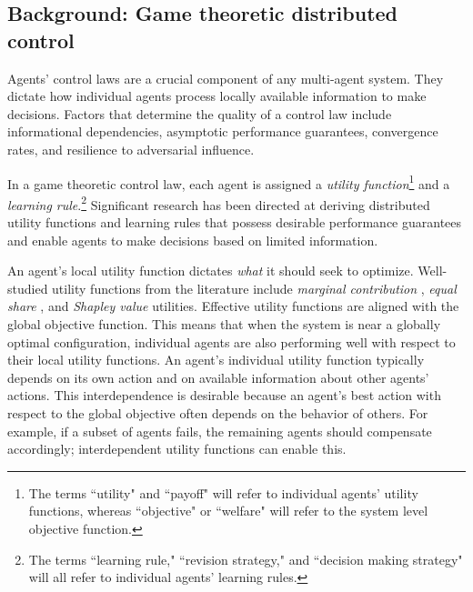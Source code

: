 \subsection{Background: Game theoretic distributed control}

Agents' control laws are a crucial component of any multi-agent system. They dictate how individual agents process locally available information to make decisions. Factors that determine the quality of a control law include informational dependencies, asymptotic performance guarantees, convergence rates, and resilience to adversarial influence.

In a game theoretic control law, each agent is assigned a {\it utility function}\footnote{The terms ``utility" and ``payoff" will refer to individual agents' utility functions, whereas ``objective" or ``welfare" will refer to the system level objective function.} and a {\it learning rule}.\footnote{The terms ``learning rule," ``revision strategy," and ``decision making strategy" will all refer to individual agents' learning rules.} Significant research has been directed at deriving distributed utility functions and learning rules that possess desirable performance guarantees and enable agents to make decisions based on limited information.





An agent's local utility function dictates {\it what} it should seek to optimize. Well-studied utility functions from the literature include {\it marginal contribution} \cite{wolpert}, {\it equal share} \cite{marden paper}, and {\it Shapley value} \cite{shapley paper} utilities. Effective utility functions are aligned with the global objective function. This means that when the system is near a globally optimal configuration, individual agents are also performing well with respect to their local utility functions.  An agent's individual utility function typically depends on its own action and on available information about other agents' actions. This interdependence is desirable because an agent's best action with respect to the global objective often depends on the behavior of others. For example, if a subset of agents fails, the remaining agents should compensate accordingly; interdependent utility functions can enable this.

